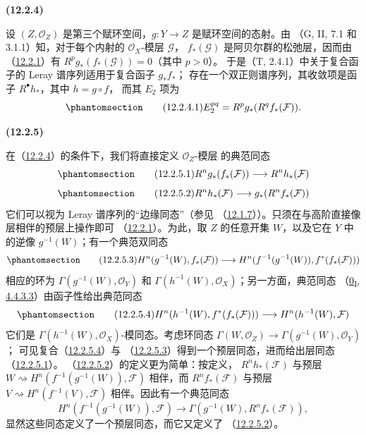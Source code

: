 \documentclass[UTF8,fontset=none,11pt,oneside,openany]{ctexbook}
\renewcommand{\leadsto}{\mathrel{\rightsquigarrow}}
\newenvironment{env}[1][]{%
  \par\medskip\noindent\textbf{(#1)}\ %
}{\par}
\newcommand{\oldpage}[2][]{%
  \hypertarget{ega-source-page-#1-#2}{}%
  \marginnote{\scriptsize\textbf{#1}~|~#2}\ignorespaces}
\let\EGAOriginalLabel\label
\renewcommand{\label}[1]{\phantomsection\EGAOriginalLabel{#1}}
\begin{document}
\begin{env}[12.2.4]
\label{0.12.2.4-fr}
设 $(Z,\mathcal O_Z)$ 是第三个赋环空间，$g:Y\to Z$ 是赋环空间的态射。由
（G, II, 7.1 和 3.1.1）知，对于每个内射的 $\mathcal O_X$-模层 $\mathcal G$，
$f_*(\mathcal G)$ 是阿贝尔群的松弛层，因而由（\hyperref[0.12.2.1-fr]{12.2.1}）有
$R^p g_*(f_*(\mathcal G))=0$（其中 $p>0$）。
于是（T, 2.4.1）中关于复合函子的 Leray 谱序列适用于复合函子 $g_*f_*$；
存在一个双正则谱序列，其收敛项是函子 $R^\bullet h_*$，其中 $h=g\circ f$，
而其 $E_2$ 项为
\[
\label{0.12.2.4.1-fr}
\tag{12.2.4.1}
E_2^{pq}=R^p g_*(R^q f_*(\mathcal F)).
\]
\end{env}
\begin{env}[12.2.5]
\label{0.12.2.5-fr}
在（\hyperref[0.12.2.4-fr]{12.2.4}）的条件下，我们将直接定义 $\mathcal O_Z$-模层
的典范同态
\[
\label{0.12.2.5.1-fr}
\tag{12.2.5.1}
R^n g_*(f_*(\mathcal F))\longrightarrow R^n h_*(\mathcal F)
\]
\[
\label{0.12.2.5.2-fr}
\tag{12.2.5.2}
R^n h_*(\mathcal F)\longrightarrow g_*(R^n f_*(\mathcal F))
\]
\oldpage[0\textsubscript{III}]{59}
它们可以视为 Leray 谱序列的“边缘同态”（参见
（\hyperref[0.12.1.7-fr]{12.1.7}））。只须在与高阶直接像层相伴的预层上操作即可
（\hyperref[0.12.2.1-fr]{12.2.1}）。为此，取 $Z$ 的任意开集 $W$，以及它在
$Y$ 中的逆像 $g^{-1}(W)$；有一个典范双同态
\[
\label{0.12.2.5.3-fr}
\tag{12.2.5.3}
H^n(g^{-1}(W),f_*(\mathcal F))\longrightarrow
H^n(f^{-1}(g^{-1}(W)),f^*(f_*(\mathcal F)))
\]
相应的环为 $\Gamma(g^{-1}(W),\mathcal O_Y)$ 和
$\Gamma(h^{-1}(W),\mathcal O_X)$；另一方面，典范同态
（\hyperref[0.4.4.3.3-fr]{0\textsubscript{I}, 4.4.3.3}）由函子性给出典范同态
\[
\label{0.12.2.5.4-fr}
\tag{12.2.5.4}
H^n(h^{-1}(W),f^*(f_*(\mathcal F)))\longrightarrow
H^n(h^{-1}(W),\mathcal F)
\]
它们是 $\Gamma(h^{-1}(W),\mathcal O_X)$-模同态。考虑环同态
$\Gamma(W,\mathcal O_Z)\to\Gamma(g^{-1}(W),\mathcal O_Y)$；
可见复合（\hyperref[0.12.2.5.4-fr]{12.2.5.4}）与
（\hyperref[0.12.2.5.3-fr]{12.2.5.3}）得到一个预层同态，进而给出层同态
（\hyperref[0.12.2.5.1-fr]{12.2.5.1}）。
（\hyperref[0.12.2.5.2-fr]{12.2.5.2}）的定义更为简单：按定义，
$R^n h_*(\mathcal F)$ 与预层 $W\leadsto H^n(f^{-1}(g^{-1}(W)),\mathcal F)$
相伴，而 $R^n f_*(\mathcal F)$ 与预层
$V\leadsto H^n(f^{-1}(V),\mathcal F)$ 相伴。因此有一个典范同态
\[
H^n(f^{-1}(g^{-1}(W)),\mathcal F)\longrightarrow
\Gamma(g^{-1}(W),R^n f_*(\mathcal F)),
\]
显然这些同态定义了一个预层同态，而它又定义了
（\hyperref[0.12.2.5.2-fr]{12.2.5.2}）。
\end{env}
\end{document}
